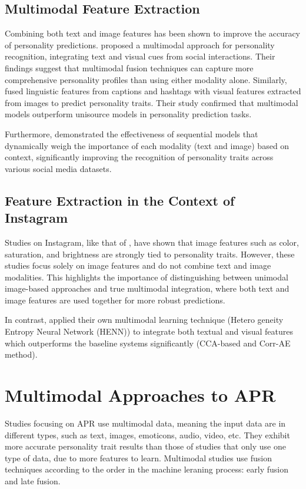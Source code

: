 \subsection{Multimodal Feature Extraction}

Combining both text and image features has been shown to improve the accuracy of personality predictions. \citet{Batrinca2016} proposed a multimodal approach for personality recognition, integrating text and visual cues from social interactions. Their findings suggest that multimodal fusion techniques can capture more comprehensive personality profiles than using either modality alone. Similarly, \citet{Skowron2016} fused linguistic features from captions and hashtags with visual features extracted from images to predict personality traits. Their study confirmed that multimodal models outperform unisource models in personality prediction tasks.

Furthermore, \citet{Lima2022b} demonstrated the effectiveness of sequential models that dynamically weigh the importance of each modality (text and image) based on context, significantly improving the recognition of personality traits across various social media datasets.

\subsection{Feature Extraction in the Context of Instagram}

Studies on Instagram, like that of \citet{Ferwerda2016}, have shown that image features such as color, saturation, and brightness are strongly tied to personality traits. However, these studies focus solely on image features and do not combine text and image modalities. This highlights the importance of distinguishing between unimodal image-based approaches and true multimodal integration, where both text and image features are used together for more robust predictions.

In contrast, \citet{Xianyu2016} applied their own multimodal learning technique (Hetero
geneity Entropy Neural Network (HENN)) to integrate both textual and visual features which outperforms the baseline systems significantly (CCA-based and Corr-AE method).

\section{Multimodal Approaches to APR}
\label{sec: MMApproaches}
Studies focusing on APR use multimodal data, meaning the input data are in different types, such as text, images, emoticons, audio, video, etc. They exhibit more accurate personality trait results than those of studies that only use one type of data, due to more features to learn. Multimodal studies use fusion techniques according to the order in the machine leraning process: early fusion and late fusion.



